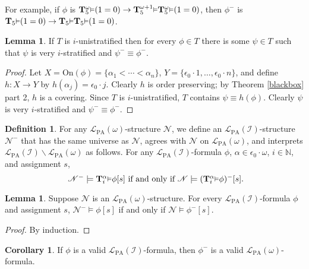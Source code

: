 \documentclass[reqno]{article}
\theoremstyle{definition}
\newtheorem{lemma}[theorem]{Lemma}
\newtheorem{corollary}[theorem]{Corollary}
\newtheorem{definition}[theorem]{Definition}
\def\N{\mathbb{N}}
\def\L{\mathscr{L}}
\def\T{\mathbf{T}}
\def\LPA{\L_{\mathrm{PA}}}
\def\epom{\epsilon_0\cdot\omega}
\def\indset{\mathcal I}
\def\onset{\mathrm{On}}
\renewcommand{\Pr}[1]{\T_{#1}\mbox{\small${\vDash}$}}
\newcommand{\Prr}[2]{\T^{#1}_{#2}\mbox{\small${\vDash}$}}
\begin{document}
For example, if $\phi$ is $\Prr{\omega}{5}(1=0)\rightarrow\Prr{\omega+1}{5}\Prr{\omega}{5}(1=0)$,
then $\phi^-$ is $\Pr{5}(1=0)\rightarrow\Pr{5}\Pr{5}(1=0)$.

\begin{lemma}
\label{verystratifiableaxioms}
If $T$ is $i$-unistratified then for every $\phi\in T$ there is some $\psi\in T$
such that $\psi$ is very $i$-stratified and $\psi^-\equiv\phi^-$.
\end{lemma}

\begin{proof}
Let $X=\onset(\phi)=\{\alpha_1<\cdots<\alpha_n\}$, $Y=\{\epsilon_0\cdot 1,\ldots,\epsilon_0\cdot n\}$,
and define $h:X\to Y$ by $h(\alpha_j)=\epsilon_0\cdot j$.
Clearly $h$ is order preserving; by Theorem \ref{blackbox} part 2, $h$ is a covering.
Since $T$ is $i$-unistratified, $T$ contains $\psi\equiv h(\phi)$.  Clearly $\psi$ is very $i$-stratified and
$\psi^-\equiv\phi^-$.
\end{proof}

\begin{definition}
For any $\LPA(\omega)$-structure $\mathscr N$,
we define an $\LPA(\indset)$-structure $\mathscr N^-$
that has the same universe as $\mathscr N$, agrees with $\mathscr N$
on $\LPA(\omega)$,
and interprets $\LPA(\indset)\backslash\LPA(\omega)$ as follows.
For any $\LPA(\indset)$-formula $\phi$, $\alpha\in\epom$, $i\in\N$, and assignment $s$,
\[
\mbox{
$\mathscr N^- \models \Prr\alpha i\phi[s]$ if and only if $\mathscr N\models (\Prr\alpha i\phi)^-[s]$.}
\]
\end{definition}


\begin{lemma}
\label{structuregrowingmagic}
Suppose $\mathscr N$ is an $\LPA(\omega)$-structure.
For every $\LPA(\indset)$-formula $\phi$ and assignment $s$,
$\mathscr N^-\models\phi[s]$ if and only if $\mathscr N\models\phi^-[s]$.
\end{lemma}



\begin{proof}
By induction.
\end{proof}

\begin{corollary}
\label{minuspreservesvalidity}
If $\phi$ is a valid $\LPA(\indset)$-formula, then $\phi^-$ is a valid $\LPA(\omega)$-formula.
\end{corollary}
\end{document}
